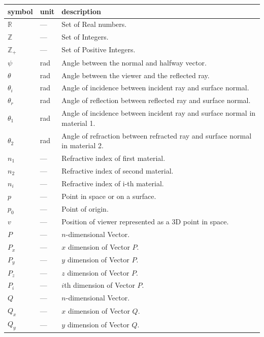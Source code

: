 \documentclass[12pt]{article}
\begin{document}
\noindent \begin{longtable*}{l l p{12cm}} \toprule
	\textbf{symbol} & \textbf{unit} & \textbf{description}\\
	\midrule 
	$\mathbb{R}$ & --- & Set of Real numbers.\\
	$\mathbb{Z}$ & --- & Set of Integers.\\
	$\mathbb{Z_{+}}$ & --- & Set of Positive Integers.\\
	$\psi$ & \si[per-mode=symbol] {\radian} & Angle between the 
	normal and 
	halfway	vector.	\\
	$\theta$ & \si[per-mode=symbol] {\radian} & Angle between the viewer and the
	reflected ray.	\\
	$\theta_{i}$ & \si[per-mode=symbol] {\radian} & Angle of incidence
	between incident ray and surface normal. \\
	$\theta_{r}$ & \si[per-mode=symbol] {\radian} & Angle of reflection
	between reflected ray and surface normal.
	\\
	$\theta_{1}$ & \si[per-mode=symbol] {\radian} & Angle of incidence between
	incident ray and surface normal in material 1.
	\\
	$\theta_{2}$ & \si[per-mode=symbol] {\radian} & Angle of refraction between
	refracted ray and surface normal in material 2.
	\\
	$n_{1}$ & --- & Refractive index of first material.
	\\
	$n_{2}$ & --- & Refractive index of second material.
	\\
	$n_{i}$ & --- & Refractive index of i-th material.
	\\
	$p$ & --- & Point in space or on a surface.
	\\
	$p_{0}$ & --- & Point of origin.
	\\
	$v$ & --- & Position of viewer represented as a 3D point in space.
	\\
	$P$ & --- & $n$-dimensional Vector.
	\\
	$P_{x}$ & --- & $x$ dimension of Vector $P$.
	\\
	$P_{y}$ & --- & $y$ dimension of Vector $P$.
	\\
	$P_{z}$ & --- & $z$ dimension of Vector $P$.
	\\
	$P_{i}$ & --- & $i$th dimension of Vector $P$.
	\\
	$Q$ & --- & $n$-dimensional Vector.
	\\
	$Q_{x}$ & --- & $x$ dimension of Vector $Q$.
	\\
	$Q_{y}$ & --- & $y$ dimension of Vector $Q$.

\end{longtable*}
\end{document}
